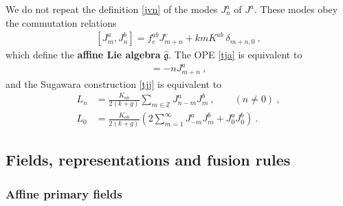 \documentclass[12pt, a4paper, notitlepage, twoside]{report}
\numberwithin{equation}{section}
\theoremstyle{break}
\begin{document}
We do not repeat the definition \eqref{jvn} of the modes $J^a_n$ of $J^a$.
These modes obey the commutation relations
\begin{align}
 \boxed{[J^a_m,J^b_n] =   f^{ab}_c J^c_{m+n} +kmK^{ab}\ \delta_{m+n,0}} \ , 
\label{jam}
\end{align}
which define the \textbf{\boldmath affine Lie algebra} $\hat{\mathfrak{g}}$. 
The OPE \eqref{tja} is equivalent to
\begin{align}
 [L_m,J^a_n] = -nJ^a_{m+n}\ ,
\end{align}
and the Sugawara construction \eqref{tjj} is equivalent to 
\begin{align}
 L_n &= \frac{K_{ab}}{2(k+g)} \sum_{m\in{\mathbb{Z}}} J^a_{n-m}J^b_m\ , \qquad (n\neq 0)\ ,
\label{ljj}
\\
L_0 & = \frac{K_{ab}}{2(k+g)}\left(2\sum_{m=1}^\infty J^a_{-m}J^b_m + J^a_0J^b_0\right)\ .
\label{lzjj}
\end{align}

\subsection{Fields, representations and fusion rules}
 
\subsubsection{Affine primary fields} 
 
\end{document}
